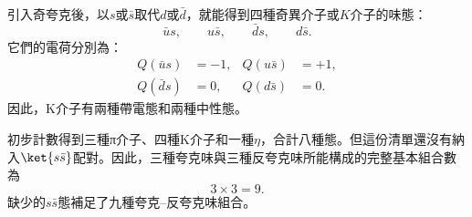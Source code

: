 \begin{classroomqa}
\end{classroomqa}

\begin{classroomqa}
\end{classroomqa}

\begin{classroomqa}
\end{classroomqa}

引入奇夸克後，以\(s\)或\(\bar s\)取代\(d\)或\(\bar d\)，就能得到四種奇異介子或\(K\)介子的味態：
\begin{equation}
\bar u s,\qquad u\bar s,\qquad \bar d s,\qquad d\bar s.
\end{equation}
它們的電荷分別為：
\begin{align}
Q(\bar u s) &=-1,
&
Q(u\bar s) &=+1,
\\
Q(\bar d s) &=0,
&
Q(d\bar s) &=0.
\end{align}
因此，K介子有兩種帶電態和兩種中性態。

初步計數得到三種{\proseunicodefont π}介子、四種K介子和一種\(\eta\)，合計八種態。但這份清單還沒有納入\(\ket{s\bar s}\)配對。因此，三種夸克味與三種反夸克味所能構成的完整基本組合數為
\begin{equation}
3\times3=9.
\end{equation}
缺少的\(s\bar s\)態補足了九種夸克--反夸克味組合。